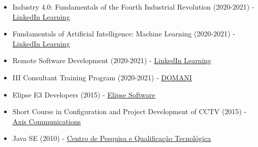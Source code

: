 \documentclass[11pt,a4paper,sans]{moderncv}
\begin{document}
\begin{samepage}
{\begin{itemize}[label=\textbullet]
		  \item Industry 4.0: Fundamentals of the Fourth Industrial Revolution (2020-2021) - \underline{\color{blue}\href{https://linkedin.com/learning}{LinkedIn Learning}}
		  \item Fundamentals of Artificial Intelligence: Machine Learning (2020-2021) - \underline{\color{blue}\href{https://linkedin.com/learning}{LinkedIn Learning}}
		  \item Remote Software Development (2020-2021) - \underline{\color{blue}\href{https://linkedin.com/learning}{LinkedIn Learning}}
		  \item III Consultant Training Program (2020-2021) - \underline{\color{blue}\href{https://domani.com.br}{DOMANI}}
		  \item Elipse E3 Developers (2015) - \underline{\color{blue}\href{https://elipse.com}{Elipse Software}}
		  \item Short Course in Configuration and Project Development of CCTV (2015) - \underline{\color{blue}\href{https://axis.com}{Axis Communications}}
		  \item Java SE (2010) - \underline{\color{blue}\href{https://cpqt.com.br}{Centro de Pesquisa e Qualificação Tecnológica}}
	  \end{itemize}}
\end{samepage}
\vspace{\baselineskip}
\end{document}
